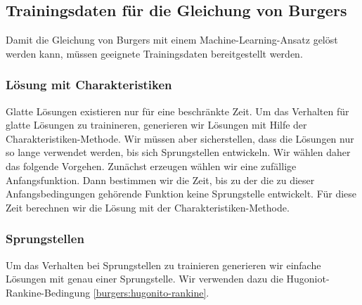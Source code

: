 %
%
%
\subsection{Trainingsdaten für die Gleichung von Burgers\label{burgers:training}}
Damit die Gleichung von Burgers mit einem Machine-Learning-Ansatz gelöst
werden kann, müssen geeignete Trainingsdaten bereitgestellt werden.


\subsubsection{Lösung mit Charakteristiken}
Glatte Lösungen existieren nur für eine beschränkte Zeit.
Um das Verhalten für glatte Lösungen zu trainineren, generieren
wir Lösungen mit Hilfe der Charakteristiken-Methode.
Wir müssen aber sicherstellen, dass die Lösungen nur so lange verwendet
werden, bis sich Sprungstellen entwickeln.
Wir wählen daher das folgende Vorgehen.
Zunächst erzeugen wählen wir eine zufällige Anfangsfunktion.
Dann bestimmen wir die Zeit, bis zu der die zu dieser Anfangsbedingungen
gehörende Funktion keine Sprungstelle entwickelt.
Für diese Zeit berechnen wir die Lösung mit der Charakteristiken-Methode.

\subsubsection{Sprungstellen}
Um das Verhalten bei Sprungstellen zu trainieren generieren wir
einfache Lösungen mit genau einer Sprungstelle.
Wir verwenden dazu die Hugoniot-Rankine-Bedingung \eqref{burgers:hugonito-rankine}.


